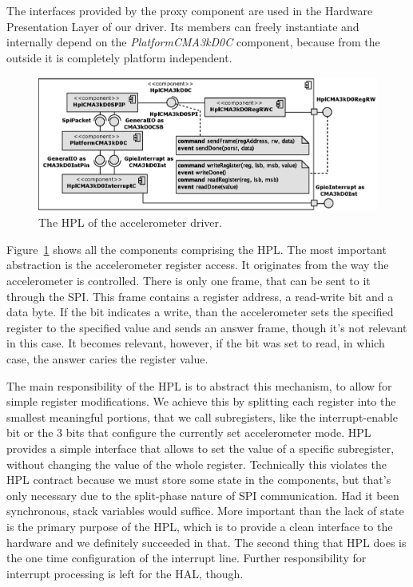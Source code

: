 The interfaces provided by the proxy component are used in the Hardware Presentation Layer of our driver. Its members can freely instantiate and internally depend on the \emph{PlatformCMA3kD0C} component, because from the outside it is completely platform independent.
\begin{figure}[h]
  \centering
  \includegraphics[width=1.0\textwidth]{diagrams/hpl_cma3kd0_c.eps}
  \caption{The HPL of the accelerometer driver.}
  \label{fig:hpl_cma3kd0_c}
\end{figure}
Figure~\ref{fig:hpl_cma3kd0_c} shows all the components comprising the HPL. The most important abstraction is the accelerometer register access. It originates from the way the accelerometer is controlled. There is only one frame, that can be sent to it through the SPI. This frame contains a register address, a read-write bit and a data byte. If the bit indicates a write, than the accelerometer sets the specified register to the specified value and sends an answer frame, though it's not relevant in this case. It becomes relevant, however, if the bit was set to read, in which case, the answer caries the register value.

The main responsibility of the HPL is to abstract this mechanism, to allow for simple register modifications. We achieve this by splitting each register into the smallest meaningful portions, that we call subregisters, like the interrupt-enable bit or the 3 bits that configure the currently set accelerometer mode. HPL provides a simple interface that allows to set the value of a specific subregister, without changing the value of the whole register. Technically this violates the HPL contract because we must store some state in the components, but that's only necessary due to the split-phase nature of SPI communication. Had it been synchronous, stack variables would suffice. More important than the lack of state is the primary purpose of the HPL, which is to provide a clean interface to the hardware and we definitely succeeded in that.  The second thing that HPL does is the one time configuration of the interrupt line. Further responsibility for interrupt processing is left for the HAL, though.

